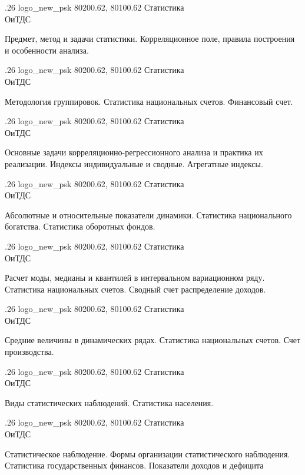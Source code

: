 \documentclass[
	12pt,
	a4paper,
	]
	{article}
\newcommand{\shapkFull}{
	\shapk
		{.26}
		{logo_new_psk}
		{80200.62, 80100.62}
		{Статистика\\}
		{ОиТДС}
		{}
}
\begin{document}
\shapkFull
\setcounter{zad}{0}

\z Предмет, метод и задачи статистики.
 \medskip
\z Корреляционное поле, правила построения и особенности анализа.
 \medskip

\newpage


\shapkFull
\setcounter{zad}{0}

\z Методология группировок.
 \medskip
\z Статистика национальных счетов. Финансовый счет.
 \medskip

\newpage


\shapkFull
\setcounter{zad}{0}

\z Основные задачи корреляционно-регрессионного анализа и практика их реализации.
 \medskip
\z Индексы индивидуальные и сводные. Агрегатные индексы.
 \medskip

\newpage


\shapkFull
\setcounter{zad}{0}

\z Абсолютные и относительные показатели динамики.
 \medskip
\z Статистика национального богатства. Статистика оборотных фондов.
 \medskip

\newpage


\shapkFull
\setcounter{zad}{0}

\z Расчет моды, медианы и квантилей в интервальном вариационном ряду.
 \medskip
\z Статистика национальных счетов. Сводный счет распределение доходов.
 \medskip

\newpage


\shapkFull
\setcounter{zad}{0}

\z Средние величины в динамических рядах.
 \medskip
\z Статистика национальных счетов. Счет производства.
 \medskip

\newpage


\shapkFull
\setcounter{zad}{0}

\z Виды статистических наблюдений.
 \medskip
\z Статистика населения.
 \medskip

\newpage


\shapkFull
\setcounter{zad}{0}

\z Статистическое наблюдение. Формы организации статистического наблюдения.
 \medskip
\z Статистика государственных финансов. Показатели доходов и дефицита
 \medskip
\end{document}

